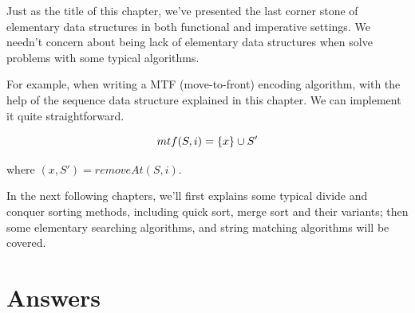 \documentclass[b5paper]{article}
\begin{document}
Just as the title of this chapter, we've presented the last corner stone of
elementary data structures in both functional and imperative settings.
We needn't concern about being lack of elementary data structures when
solve problems with some typical algorithms.

For example, when writing a MTF (move-to-front) encoding algorithm\cite{mtf-wiki}, with
the help of the sequence data structure explained in this chapter. We can
implement it quite straightforward.

\[
mtf(S, i) = \{x\} \cup S' \\
\]

where $(x, S') = removeAt(S, i)$.

In the next following chapters, we'll first explains some typical divide and conquer
sorting methods, including quick sort, merge sort and their variants; then
some elementary searching algorithms, and string matching algorithms will be
covered.

\ifx\wholebook\relax \else
\section{Answers}
\shipoutAnswer
\end{document}
